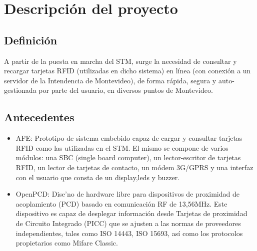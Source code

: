 \chapter{Descripci\'on del proyecto}

\section{Definici\'on}

A partir de la puesta en marcha del STM, surge la necesidad de consultar y recargar tarjetas RFID (utilizadas en dicho sistema) en l\'inea (con conexi\'on a un servidor de la Intendencia de Montevideo), de forma r\'apida, segura y auto-gestionada por parte del usuario, en diversos puntos de Montevideo.

\section{Antecedentes}

\begin{itemize}

\item AFE: Prototipo de sistema embebido capaz de cargar y consultar tarjetas RFID como las utilizadas en el STM. El mismo se compone de varios m\'odulos: una SBC (single board computer), un lector-escritor de tarjetas RFID, un lector de tarjetas de contacto, un m\'odem 3G/GPRS y una interfaz con el usuario que consta de un display,leds y buzzer.

\item OpenPCD: Dise'no de hardware libre para dispositivos de proximidad de acoplamiento (PCD) basado en comunicaci\'on RF de 13,56MHz. Este dispositivo es capaz de desplegar informaci\'on desde Tarjetas de proximidad de Circuito Integrado (PICC) que se ajusten a las normas de proveedores independientes, tales como ISO 14443, ISO 15693, as\'i como los protocolos propietarios como Mifare Classic.

\end{itemize}